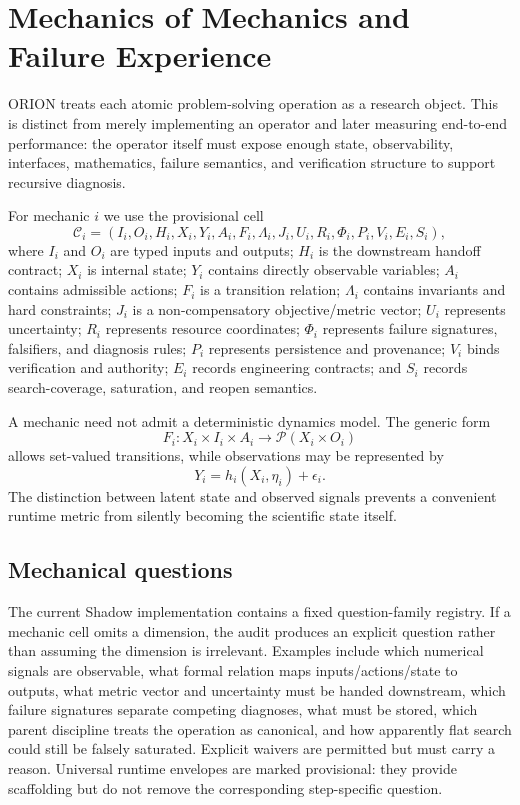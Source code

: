 \section{Mechanics of Mechanics and Failure Experience}

ORION treats each atomic problem-solving operation as a research object.  This is distinct from merely implementing an operator and later measuring end-to-end performance: the operator itself must expose enough state, observability, interfaces, mathematics, failure semantics, and verification structure to support recursive diagnosis.

For mechanic $i$ we use the provisional cell
\[
\mathcal C_i=(I_i,O_i,H_i,X_i,Y_i,A_i,F_i,\Lambda_i,J_i,U_i,R_i,\Phi_i,P_i,V_i,E_i,S_i),
\]
where $I_i$ and $O_i$ are typed inputs and outputs; $H_i$ is the downstream handoff contract; $X_i$ is internal state; $Y_i$ contains directly observable variables; $A_i$ contains admissible actions; $F_i$ is a transition relation; $\Lambda_i$ contains invariants and hard constraints; $J_i$ is a non-compensatory objective/metric vector; $U_i$ represents uncertainty; $R_i$ represents resource coordinates; $\Phi_i$ represents failure signatures, falsifiers, and diagnosis rules; $P_i$ represents persistence and provenance; $V_i$ binds verification and authority; $E_i$ records engineering contracts; and $S_i$ records search-coverage, saturation, and reopen semantics.

A mechanic need not admit a deterministic dynamics model.  The generic form
\[
F_i:X_i\times I_i\times A_i\rightarrow \mathcal P(X_i\times O_i)
\]
allows set-valued transitions, while observations may be represented by
\[
Y_i=h_i(X_i,\eta_i)+\epsilon_i.
\]
The distinction between latent state and observed signals prevents a convenient runtime metric from silently becoming the scientific state itself.

\subsection{Mechanical questions}

The current Shadow implementation contains a fixed question-family registry.  If a mechanic cell omits a dimension, the audit produces an explicit question rather than assuming the dimension is irrelevant.  Examples include which numerical signals are observable, what formal relation maps inputs/actions/state to outputs, what metric vector and uncertainty must be handed downstream, which failure signatures separate competing diagnoses, what must be stored, which parent discipline treats the operation as canonical, and how apparently flat search could still be falsely saturated.  Explicit waivers are permitted but must carry a reason.  Universal runtime envelopes are marked provisional: they provide scaffolding but do not remove the corresponding step-specific question.

